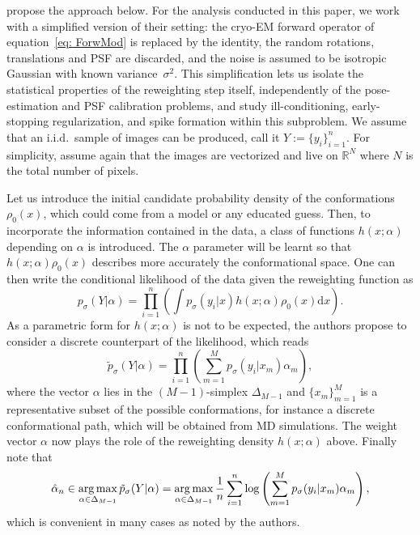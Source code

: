 \documentclass[12pt]{iopart}
\providecommand{\diff}{\mathrm{d}}
\providecommand{\argmax}{\operatornamewithlimits{\arg\max}}
\theoremstyle{remark}
\begin{document}
\citet{tang2023ensemble} propose the approach below. For the analysis
conducted in this paper, we work with a simplified version of their setting:
the cryo-EM forward operator of equation~\eqref{eq: ForwMod} is replaced by
the identity, the random rotations, translations and  PSF are discarded, and
the noise is assumed to be isotropic Gaussian with known variance~$\sigma^2$.
This simplification lets us isolate the statistical properties of the
reweighting step itself, independently of the pose-estimation and PSF
calibration problems, and study ill-conditioning, early-stopping
regularization, and spike formation within this subproblem.
We assume that an i.i.d.\ sample of images can be produced, call it
$Y:=\{y_i\}_{i=1}^n$. For simplicity, assume again that the images are
vectorized and live on $\mathbb{R}^N$ where $N$ is the total number of pixels. 




Let us introduce the initial candidate probability density of the conformations $\rho_0(x)$, which could come from a model or any educated guess. Then, to incorporate the information contained in the data, a class of functions $h(x; \alpha)$ depending on $\alpha$ is introduced. The $\alpha$ parameter will be learnt so that $h(x; \alpha)\rho_0(x)$ describes more accurately the conformational space. One can then write the conditional likelihood of the data given the reweighting function as
\[
p_\sigma(Y\vert \alpha) = \prod_{i=1}^n \left(\int  p_\sigma(y_i\vert x) h (x; \alpha) \rho_0(x)\diff x \right).
\]
As a parametric form for  $h(x; \alpha)$ is not to be expected,  the authors propose to consider a discrete counterpart of the likelihood, which reads
\begin{equation}
\label{eq: PbInterest}
\tilde p_\sigma(Y\vert \alpha) = \prod_{i=1}^n \left( \sum_{m =1}^M p_\sigma(y_i\vert x_m) \alpha_m \right), 
\end{equation}
where the vector $\alpha$ lies in the $(M-1)$-simplex $\Delta_{M-1}$ and $\{x_m\}_{m=1}^M$ is a representative subset of the possible conformations, for instance a discrete conformational path, which will be obtained from MD simulations. The weight vector $\alpha$ now plays the role of the reweighting density $h(x;\alpha)$ above.
Finally note that 
\begin{equation}
\label{eq: Objective}
	\hat\alpha_n\in \argmax_{\alpha \in \Delta_{M-1} } \tilde p_\sigma(Y\vert \alpha)  = \argmax_{\alpha \in \Delta_{M-1} }\frac1n  \sum_{i=1}^n  \log \left( \sum_{m =1}^M p_\sigma(y_i\vert x_m) \alpha_m \right),
\end{equation}
which is convenient in many cases as noted by the authors. 
\end{document}

